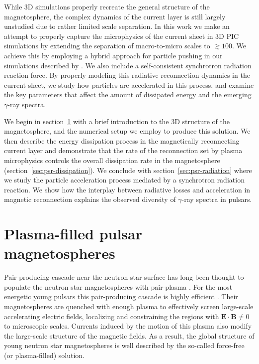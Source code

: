 While 3D simulations properly recreate the general structure of the magnetosphere, the complex dynamics of the current layer is still largely unstudied due to rather limited scale separation. In this work we make an attempt to properly capture the microphysics of the current sheet in 3D PIC simulations by extending the separation of macro-to-micro scales to $\gtrsim 100$. We achieve this by employing a hybrid approach for particle pushing in our simulations described by \cite{2020ApJS..251...10B}. We also include a self-consistent synchrotron radiation reaction force. By properly modeling this radiative reconnection dynamics in the current sheet, we study how particles are accelerated in this process, and examine the key parameters that affect the amount of dissipated energy and the emerging $\gamma$-ray spectra.

We begin in section~\ref{sec:psr-magnetosphere} with a brief introduction to the 3D structure of the magnetosphere, and the numerical setup we employ to produce this solution. We then describe the energy dissipation process in the magnetically reconnecting current layer and demonstrate that the rate of the reconnection set by plasma microphysics controls the overall dissipation rate in the magnetosphere (section~\ref{sec:psr-dissipation}). We conclude with section~\ref{sec:psr-radiation} where we study the particle acceleration process mediated by a synchrotron radiation reaction. We show how the interplay between radiative losses and acceleration in magnetic reconnection explains the observed diversity of $\gamma$-ray spectra in pulsars. 

\section{Plasma-filled pulsar magnetospheres} 
\label{sec:psr-magnetosphere}
Pair-producing cascade near the neutron star surface has long been thought to populate the neutron star magnetospheres with pair-plasma \citep{1969ApJ...157..869G, 1975ApJ...196...51R}. For the most energetic young pulsars this pair-producing cascade is highly efficient \citep{2015ApJ...810..144T, 2019ApJ...871...12T}. Their magnetospheres are quenched with enough plasma to effectively screen large-scale accelerating electric fields, localizing and constraining the regions with $\bm{E}\cdot\bm{B} \ne 0$ to microscopic scales. Currents induced by the motion of this plasma also modify the large-scale structure of the magnetic fields. As a result, the global structure of young neutron star magnetospheres is well described by the so-called force-free (or plasma-filled) solution.

